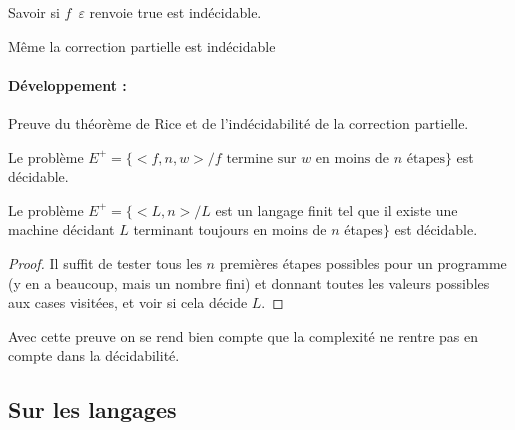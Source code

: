 \begin{example}
	Savoir si $f \enspace \varepsilon$ renvoie true est indécidable.
\end{example}

\begin{rem}
	Même la correction partielle est indécidable
\end{rem}

\paragraph{Développement :} Preuve du théorème de Rice et de l'indécidabilité de la correction partielle.

\begin{proposition}
	Le problème $E^+ = \{<f, n, w> / f\text{ termine sur } w \text{ en moins de $n$ étapes}\}$ est décidable.
\end{proposition}

\begin{proposition}
	Le problème $E^+ = \{<L, n> / L $ est un langage finit tel que il existe une machine décidant $L$ terminant toujours en moins de $n$ étapes$\}$ est décidable.
\end{proposition}

\begin{proof}
	Il suffit de tester tous les $n$ premières étapes possibles pour un programme (y en a beaucoup, mais un nombre fini) et donnant toutes les valeurs possibles aux cases visitées, et voir si cela décide $L$.
\end{proof}

\begin{rem}
	Avec cette preuve on se rend bien compte que la complexité ne rentre pas en compte dans la décidabilité.
\end{rem}

\subsection{Sur les langages}

